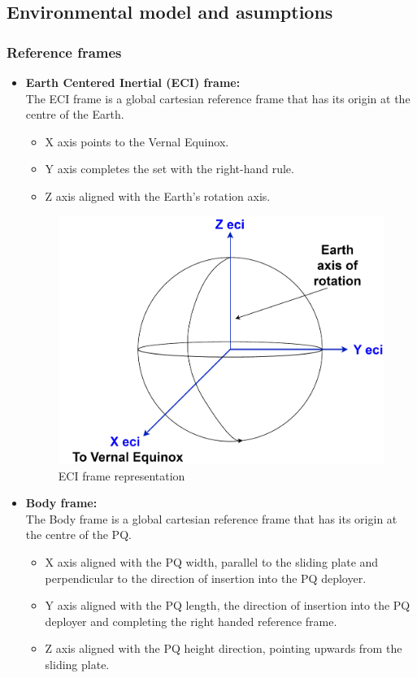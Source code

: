 \subsection{Environmental model and asumptions}

\subsubsection{Reference frames}
\begin{itemize}
    \item \textbf{Earth Centered Inertial (ECI) frame:}\\
    The ECI frame is a global cartesian reference frame that has its origin at the centre of the
    Earth.
    \begin{itemize}
        \item X axis points to the Vernal Equinox.
        \item Y axis completes the set with the right-hand rule.
        \item Z axis aligned with the Earth's rotation axis.
    \end{itemize}

    \begin{figure}[H]
        \centering
        \includegraphics[width=0.4\linewidth]{res/img/3_simulation_performance/ECI frame.drawio.pdf}
        \caption{ECI frame representation}
        \label{fig:ECIframe}
    \end{figure}

    \item \textbf{Body frame:}\\
    The Body frame is a global cartesian reference frame that has its origin at the centre of
    the PQ.
    \begin{itemize}
        \item X axis aligned with the PQ width, parallel to the sliding plate and perpendicular
        to the direction of insertion into the PQ deployer.
        \item Y axis aligned with the PQ length, the direction of insertion into the
        PQ deployer and completing the right handed reference frame.
        \item Z axis aligned with the PQ height direction, pointing upwards from the
        sliding plate.


\end{itemize}
\end{itemize}
